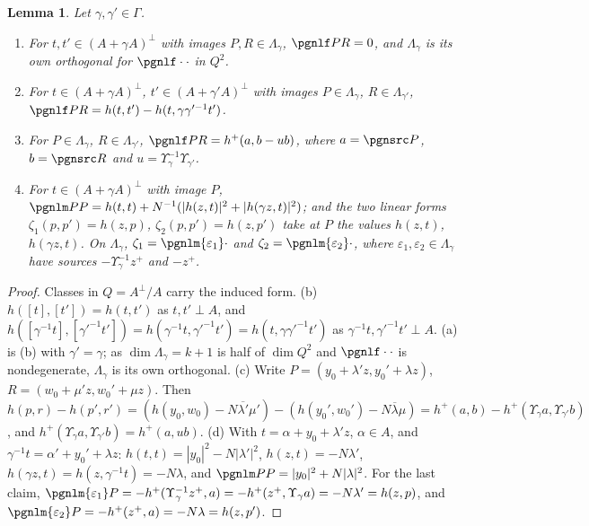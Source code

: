 \documentclass[10pt]{amsart}
\newtheorem{lemma}[theorem]{Lemma}
\theoremstyle{definition}
\theoremstyle{remark}
\providecommand{\aubar}[1]{\overline{#1}}
\begin{document}
\begin{lemma}\label{pbg:linkforms}
Let $\gamma,\gamma'\in\Gamma$.
\begin{enumerate}
\item[(a)] For $t,t'\in(A+\gamma A)^\perp$ with images $P,R\in\Lambda_\gamma$, $\pgnlf PR=0$, and
$\Lambda_\gamma$ is its own orthogonal for $\pgnlf\cdot\cdot$ in $Q^2$.
\item[(b)] For $t\in(A+\gamma A)^\perp$, $t'\in(A+\gamma'A)^\perp$ with images $P\in\Lambda_\gamma$,
$R\in\Lambda_{\gamma'}$, $\pgnlf PR=h(t,t')-h(t,\gamma\gamma'^{-1}t')$.
\item[(c)] For $P\in\Lambda_\gamma$, $R\in\Lambda_{\gamma'}$, $\pgnlf PR=h^+(a,b-ub)$, where $a=\pgnsrc P$,
$b=\pgnsrc R$ and $u=\Upsilon_\gamma^{-1}\Upsilon_{\gamma'}$.
\item[(d)] For $t\in(A+\gamma A)^\perp$ with image $P$, $\pgnlm PP=h(t,t)+N^{-1}(|h(z,t)|^2+|h(\gamma z,
t)|^2)$; and the two linear forms $\zeta_1(p,p')=h(z,p)$, $\zeta_2(p,p')=h(z,p')$ take at $P$ the values
$h(z,t)$, $h(\gamma z,t)$. On $\Lambda_\gamma$, $\zeta_1=\pgnlm{\varepsilon_1}\cdot$ and $\zeta_2=
\pgnlm{\varepsilon_2}\cdot$, where $\varepsilon_1,\varepsilon_2\in\Lambda_\gamma$ have sources
$-\Upsilon_\gamma^{-1}z^+$ and $-z^+$.
\end{enumerate}
\end{lemma}
\begin{proof}
Classes in $Q=A^\perp/A$ carry the induced form. (b) $h([t],[t'])=h(t,t')$ as $t,t'\perp A$, and
$h([\gamma^{-1}t],[\gamma'^{-1}t'])=h(\gamma^{-1}t,\gamma'^{-1}t')=h(t,\gamma\gamma'^{-1}t')$ as
$\gamma^{-1}t,\gamma'^{-1}t'\perp A$. (a) is (b) with $\gamma'=\gamma$; as $\dim\Lambda_\gamma=k+1$ is
half of $\dim Q^2$ and $\pgnlf\cdot\cdot$ is nondegenerate, $\Lambda_\gamma$ is its own orthogonal. (c) Write
$P=(y_0+\lambda'z,y_0'+\lambda z)$, $R=(w_0+\mu'z,w_0'+\mu z)$. Then $h(p,r)-h(p',r')=(h(y_0,w_0)-
N\aubar{\lambda'}\mu')-(h(y_0',w_0')-N\aubar\lambda\mu)=h^+(a,b)-h^+(\Upsilon_\gamma a,\Upsilon_{\gamma'}b)$,
and $h^+(\Upsilon_\gamma a,\Upsilon_{\gamma'}b)=h^+(a,ub)$. (d) With $t=\alpha+y_0+\lambda'z$, $\alpha\in A$,
and $\gamma^{-1}t=\alpha'+y_0'+\lambda z$: $h(t,t)=|y_0|^2-N|\lambda'|^2$, $h(z,t)=-N\lambda'$, $h(\gamma
z,t)=h(z,\gamma^{-1}t)=-N\lambda$, and $\pgnlm PP=|y_0|^2+N|\lambda|^2$. For the last claim,
$\pgnlm{\varepsilon_1}P=-h^+(\Upsilon_\gamma^{-1}z^+,a)=-h^+(z^+,\Upsilon_\gamma a)=-N\lambda'=h(z,p)$, and
$\pgnlm{\varepsilon_2}P=-h^+(z^+,a)=-N\lambda=h(z,p')$.
\end{proof}
\end{document}
